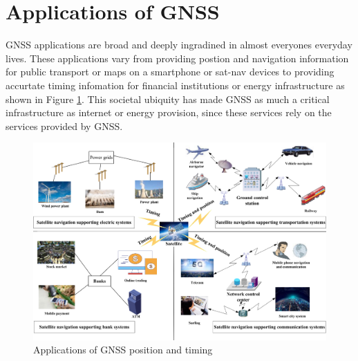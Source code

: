 
\section{Applications of GNSS} \label{sec:ApplicationsGNSS}
GNSS applications are broad and deeply ingradined in almost everyones everyday lives. These applications vary from providing postion and navigation information for public
transport or maps on a smartphone or sat-nav devices to providing accurtate timing infomation for financial institutions or energy infrastructure \cite{RN33} \cite{RN12}
as shown in Figure \ref{fig:GNSS Applications}. This societal ubiquity has made GNSS as much a critical infrastructure as internet or energy provision, since these
services rely on the services provided by GNSS.

\begin{figure}[h]
    \begin{centering}
        \includegraphics[width=14cm,keepaspectratio]{Figures/GNSS applications.png}
        \caption{Applications of GNSS position and timing \cite{RN33}}
        \label{fig:GNSS Applications}
    \end{centering}
\end{figure}


